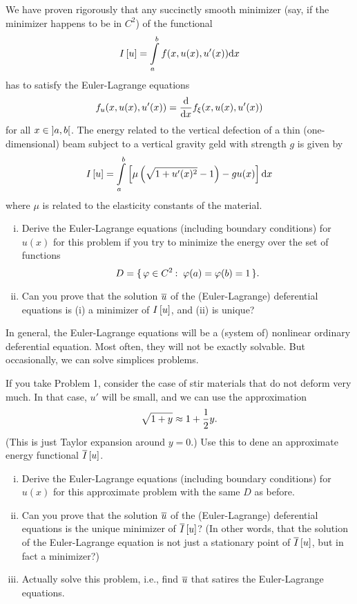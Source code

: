 \documentclass[12pt]{memoir}
\begin{document}
\begin{Ej}
    We have proven rigorously that any succinctly smooth minimizer (say, if the minimizer happens to be in $C^2$) of the functional
    $$I\left\lbrack u\right\rbrack=\int\limits_a^b f(x,u(x),u'(x))\dd x $$
    has to satisfy the Euler-Lagrange equations
    $$f_u(x,u(x),u'(x))=\dv{x}f_\xi(x,u(x),u'(x))$$
    for all $x\in\left\rbrack a,b\right\lbrack$. The energy related to the vertical defection of a thin (one-dimensional) beam subject to a vertical gravity geld with strength $g$ is given by
    $$I\left\lbrack u\right\rbrack=\int\limits_a^b \left\lbrack\mu\left(\sqrt{1+u'(x)^2}-1\right)-gu(x)\right\rbrack\dd x $$
    where $\mu$ is related to the elasticity constants of the material.
    \begin{enumerate}[i)]
        \item Derive the Euler-Lagrange equations (including boundary conditions) for $u(x)$ for this problem if you
        try to minimize the energy over the set of functions
        $$D=\set{\vf\in C^2\:\ \vf(a)=\vf(b)=1}.$$
        \item Can you prove that the solution $\overline u$ of the (Euler-Lagrange) deferential equations is (i) a minimizer of
        $I\left\lbrack u\right\rbrack$, and (ii) is unique?
    \end{enumerate}
\end{Ej}

\begin{ptcbr}
    
\end{ptcbr}

\begin{Ej}
    In general, the Euler-Lagrange equations will be a (system
    of) nonlinear ordinary deferential equation. Most often, they will not be exactly solvable. But occasionally,
    we can solve simplices problems.\par
    If you take Problem 1, consider the case of stir materials that do not deform very much. In that case, $u'$
    will be small, and we can use the approximation
    $$\sqrt{1+y}\approx 1+\half y.$$
    (This is just Taylor expansion around $y = 0$.) Use this to dene an approximate energy functional $\overline I\left\lbrack u\right\rbrack$.
    \begin{enumerate}[i)]
        \item Derive the Euler-Lagrange equations (including boundary conditions) for $u(x)$ for this approximate
        problem with the same $D$ as before.
        \item Can you prove that the solution $\overline u$ of the (Euler-Lagrange) deferential equations is the unique minimizer
        of $\overline I\left\lbrack u\right\rbrack$? (In other words, that the solution of the Euler-Lagrange equation is not just a stationary
        point of $\overline I\left\lbrack u\right\rbrack$, but in fact a minimizer?)
        \item Actually solve this problem, i.e., ﬁnd $\overline u$ that satires the Euler-Lagrange equations.
    \end{enumerate}
\end{Ej}
\end{document}
